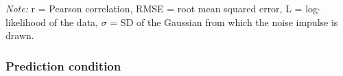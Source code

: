 \documentclass[10pt, letterpaper]{article}
\begin{document}
\begin{table}[b]
\caption{Summary of model results for Experiments 1 and 2 as applied to the data in the \emph{selection condition}.}
\label{tab:model_results}
\vspace{-0.2cm}
\centering
{}
{\fontsize{8}{9}\selectfont 
\begin{flushleft}
\emph{Note:}  r = Pearson correlation, RMSE = root mean squared error, L = log-likelihood of the data, $\sigma$ = SD of the Gaussian from which the noise impulse is drawn.
\end{flushleft}
}
\end{table}

\subsubsection{Prediction condition}
\label{ssub:prediction_condition}
\end{document}
